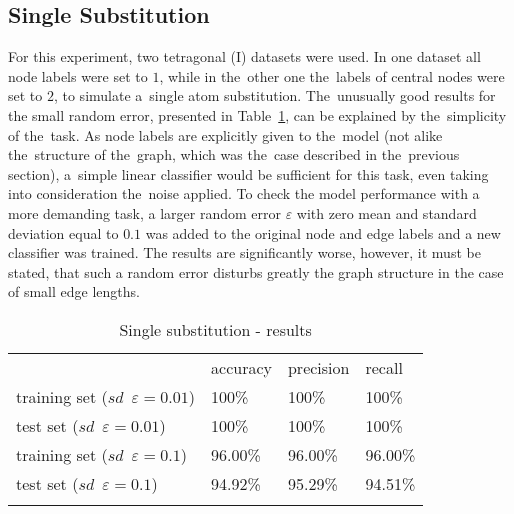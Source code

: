 \documentclass{llncs}
\begin{document}
\subsection{Single Substitution}
For this experiment, two tetragonal (I) datasets were used. In one dataset all node labels were set to $1$, while in the~other one the~labels of central nodes were set to $2$, to simulate a~single atom substitution. The~unusually good results for the small random error, presented in Table~\ref{tab:subst}, can be explained by the~simplicity of the~task. As node labels are explicitly given to the~model (not alike the~structure of the~graph, which was the~case described in the~previous section), a~simple linear classifier would be sufficient for this task, even taking into consideration the~noise applied. To check the model performance with a more demanding task, a larger random error $\varepsilon$ with zero mean and standard deviation equal to $0.1$ was added to the original node and edge labels and a new classifier was trained. The results are significantly worse, however, it must be stated, that such a random error disturbs greatly the graph structure in the case of small edge lengths.

\begin{table}[h!]
\begin{center}
\caption{Single substitution - results}
\begin{tabular}{llll}
\hline\noalign{\smallskip}
 & accuracy & precision & recall\\
\noalign{\smallskip}
\hline
\noalign{\smallskip}
training set ($sd \enspace \varepsilon = 0.01$) & 100\% &  100\% & 100\% \\
test set ($sd \enspace \varepsilon = 0.01$) & 100\% & 100\% & 100\% \\
training set ($sd \enspace \varepsilon = 0.1$) & 96.00\% &  96.00\% & 96.00\% \\
test set ($sd \enspace \varepsilon = 0.1$) & 94.92\% & 95.29\% & 94.51\% \\
\hline
\label{tab:subst}
\end{tabular}
\end{center}
\end{table}
\end{document}
